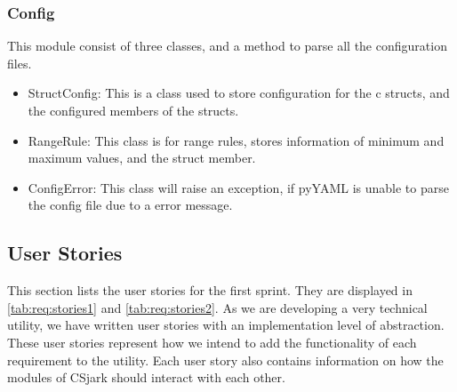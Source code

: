 \subsubsection{Config}
This module consist of three classes, and a method to parse all the configuration files.
\begin{itemize}
	\item StructConfig: This is a class used to store configuration for the \Gls{c} structs, and the configured members of the structs.
	\item RangeRule: This class is for range rules, stores information of minimum and maximum values, and the struct member.
	\item ConfigError: This class will raise an exception, if pyYAML is unable to parse the config file due to a error message.
\end{itemize}

\subsection{User Stories}
\label{sec:req:stories1}
This section lists the user stories for the first sprint. They are displayed in \autoref{tab:req:stories1} and \autoref{tab:req:stories2}.
As we are developing a very technical \gls{utility}, we have written user stories with an implementation level of abstraction. 
These user stories represent how we intend to add the functionality of each requirement to the \gls{utility}.
Each user story also contains information on how the modules of CSjark should interact with each other.

